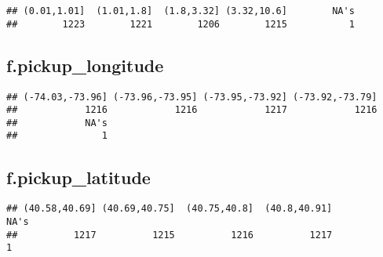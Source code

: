 \documentclass[]{article}
\newenvironment{Shaded}{\begin{snugshade}}{\end{snugshade}}
\newcommand{\KeywordTok}[1]{\textcolor[rgb]{0.13,0.29,0.53}{\textbf{{#1}}}}
\newcommand{\CommentTok}[1]{\textcolor[rgb]{0.56,0.35,0.01}{\textit{{#1}}}}
\newcommand{\NormalTok}[1]{{#1}}
\begin{document}
\begin{Shaded}
\end{Shaded}

\begin{verbatim}
## (0.01,1.01]  (1.01,1.8]  (1.8,3.32] (3.32,10.6]        NA's 
##        1223        1221        1206        1215           1
\end{verbatim}

\subsection{f.pickup\_longitude}\label{f.pickup_longitude}

\begin{Shaded}
\end{Shaded}

\begin{verbatim}
## (-74.03,-73.96] (-73.96,-73.95] (-73.95,-73.92] (-73.92,-73.79] 
##            1216            1216            1217            1216 
##            NA's 
##               1
\end{verbatim}

\subsection{f.pickup\_latitude}\label{f.pickup_latitude}

\begin{Shaded}
\end{Shaded}

\begin{verbatim}
## (40.58,40.69] (40.69,40.75]  (40.75,40.8]  (40.8,40.91]          NA's 
##          1217          1215          1216          1217             1
\end{verbatim}
\end{document}
